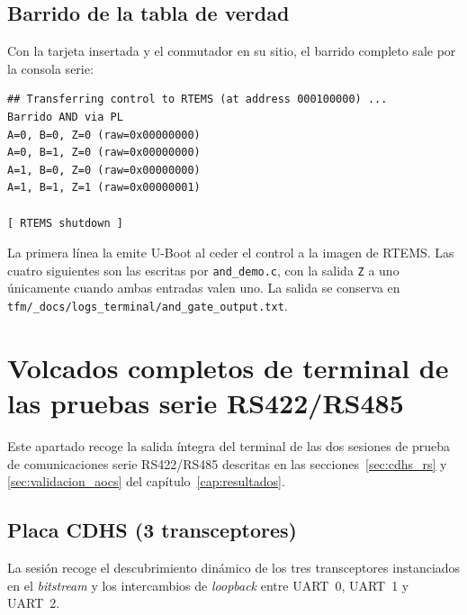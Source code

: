 \subsection{Barrido de la tabla de verdad}

Con la tarjeta insertada y el conmutador en su sitio, el barrido completo sale por la consola
serie:

\begin{lstlisting}[caption={Salida de terminal --- barrido de la puerta AND}]
## Transferring control to RTEMS (at address 000100000) ...
Barrido AND via PL
A=0, B=0, Z=0 (raw=0x00000000)
A=0, B=1, Z=0 (raw=0x00000000)
A=1, B=0, Z=0 (raw=0x00000000)
A=1, B=1, Z=1 (raw=0x00000001)

[ RTEMS shutdown ]
\end{lstlisting}

La primera línea la emite U-Boot al ceder el control a la imagen de RTEMS. Las cuatro siguientes
son las escritas por \texttt{and\_demo.c}, con la salida \texttt{Z} a uno únicamente cuando ambas
entradas valen uno. La salida se conserva en
\texttt{tfm/\_docs/\allowbreak logs\_terminal/\allowbreak and\_gate\_output.txt}.

\section{Volcados completos de terminal de las pruebas serie RS422/RS485} \label{anxC:volcados_serie}

Este apartado recoge la salida íntegra del terminal de las dos sesiones de prueba de
comunicaciones serie RS422/RS485 descritas en las secciones~\ref{sec:cdhs_rs} y
\ref{sec:validacion_aocs} del capítulo~\ref{cap:resultados}.

\subsection{Placa CDHS (3 transceptores)} \label{anxC:volcado_cdhs}

La sesión recoge el descubrimiento dinámico de los tres transceptores instanciados en el
\textit{bitstream} y los intercambios de \textit{loopback} entre UART~0, UART~1 y UART~2.

